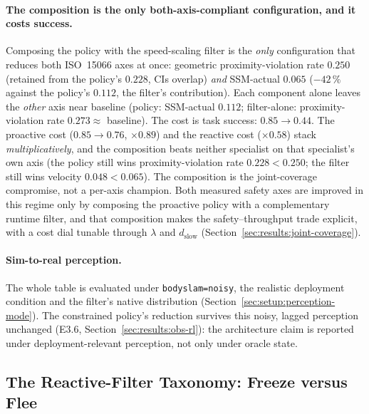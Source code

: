 \documentclass[11pt,a4paper]{report}
\newcommand{\ssm}{SSM}
\newcommand{\iso}{ISO~15066}
\begin{document}
\paragraph{The composition is the only both-axis-compliant
configuration, and it costs success.}
Composing the policy with the speed-scaling filter is the \emph{only}
configuration that reduces both \iso{} axes at once: geometric
proximity-violation rate $0.250$ (retained from the policy's $0.228$, CIs overlap)
\emph{and} \ssm{}-actual $0.065$ ($-42\,\%$ against the policy's
$0.112$, the filter's contribution). Each component alone leaves the
\emph{other} axis near baseline (policy: \ssm{}-actual $0.112$;
filter-alone: proximity-violation rate $0.273 \approx$ baseline). The cost is task
success: $0.85 \rightarrow 0.44$. The proactive cost ($0.85 \to 0.76$,
$\times 0.89$) and the reactive cost ($\times 0.58$) stack
\emph{multiplicatively}, and the composition beats neither specialist
on that specialist's own axis (the policy still wins proximity-violation rate
$0.228 < 0.250$; the filter still wins velocity $0.048 < 0.065$). The
composition is the joint-coverage compromise, not a per-axis champion.
Both measured safety axes are improved in this regime only by composing
the proactive policy with a complementary runtime filter, and that
composition makes the safety--throughput trade explicit, with a cost
dial tunable through $\lambda$ and $d_{\mathrm{slow}}$
(Section~\ref{sec:results:joint-coverage}).

\paragraph{Sim-to-real perception.}
The whole table is evaluated under \texttt{bodyslam=noisy}, the
realistic deployment condition and the filter's native distribution
(Section~\ref{sec:setup:perception-mode}). The constrained policy's reduction
survives this noisy, lagged perception unchanged (E3.6,
Section~\ref{sec:results:obs-rl}): the architecture claim is reported
under deployment-relevant perception, not only under oracle state.

\subsection{The Reactive-Filter Taxonomy: Freeze versus Flee}
\label{sec:results:reactive-taxonomy}
\end{document}
